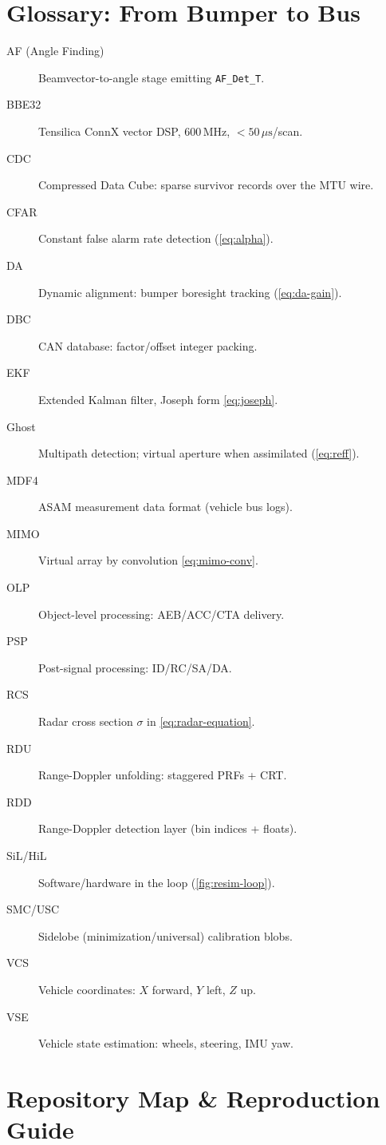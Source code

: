 \documentclass[11pt,oneside]{book}
\begin{document}
\chapter{Glossary: From Bumper to Bus}
\label{ch:glossary}

\begin{description}
\item[AF (Angle Finding)] Beamvector-to-angle stage emitting \texttt{AF\_Det\_T}.
\item[BBE32] Tensilica ConnX vector DSP, $600\,\mathrm{MHz}$, $<50\,\mu\mathrm{s}$/scan.
\item[CDC] Compressed Data Cube: sparse survivor records over the MTU wire.
\item[CFAR] Constant false alarm rate detection (\cref{eq:alpha}).
\item[DA] Dynamic alignment: bumper boresight tracking (\cref{eq:da-gain}).
\item[DBC] CAN database: factor/offset integer packing.
\item[EKF] Extended Kalman filter, Joseph form \cref{eq:joseph}.
\item[Ghost] Multipath detection; virtual aperture when assimilated (\cref{eq:reff}).
\item[MDF4] ASAM measurement data format (vehicle bus logs).
\item[MIMO] Virtual array by convolution \cref{eq:mimo-conv}.
\item[OLP] Object-level processing: AEB/ACC/CTA delivery.
\item[PSP] Post-signal processing: ID/RC/SA/DA.
\item[RCS] Radar cross section $\sigma$ in \cref{eq:radar-equation}.
\item[RDU] Range-Doppler unfolding: staggered PRFs + CRT.
\item[RDD] Range-Doppler detection layer (bin indices + floats).
\item[SiL/HiL] Software/hardware in the loop (\cref{fig:resim-loop}).
\item[SMC/USC] Sidelobe (minimization/universal) calibration blobs.
\item[VCS] Vehicle coordinates: $X$ forward, $Y$ left, $Z$ up.
\item[VSE] Vehicle state estimation: wheels, steering, IMU yaw.
\end{description}

\chapter{Repository Map \& Reproduction Guide}
\label{ch:repro}
\end{document}
